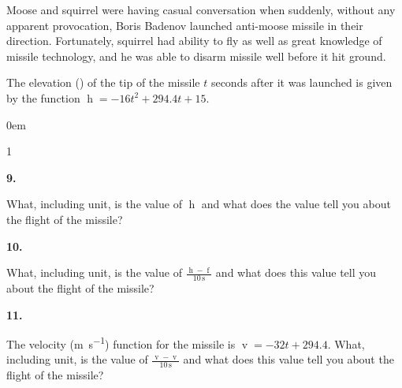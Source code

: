 \documentclass[12pt,]{book}
\theoremstyle{plain}
\theoremstyle{definition}
\numberwithin{equation}{section}
\newenvironment{exercisegroup}%
{\medskip\noindent}%
{\par\bigskip}%
\newlength{\exercisegroupindent}%
\newlength{\exercisegroupitemwidth}%
\newenvironment{exercisegrouplist}%
{\vspace{-\partopsep}%
\begin{adjustwidth}{\exercisegroupindent}{0em}}%
{\end{adjustwidth}%
\vspace{-\partopsep}%
\vspace{\baselineskip}}%
\newenvironment{exercisegroupbycol}[1]%
{\begin{exercisegrouplist}%
\vspace{-\multicolsep}%
\begin{multicols}{#1}%
\setlength{\parindent}{0em}%
\setlength{\exercisegroupitemwidth}{\linewidth}}%
{\end{multicols}%
\vspace{-\multicolsep}%
\end{exercisegrouplist}}%
\newenvironment{exercisegroupitem}[1]%
{\begin{minipage}[t]{\exercisegroupitemwidth}
\vspace{0pt}%
{\bfseries#1}%
\rule{0pt}{\baselineskip}}{\strut%
\end{minipage}%
\hspace{\columnsep}}%
\providecommand\phantomsection{}
\newcommand{\fe}[2]{\mathop{{#1}{\left(#2\right)}}}
\begin{document}
\begin{exercisegroup}%
Moose and squirrel were having casual conversation when suddenly, without any apparent provocation, Boris Badenov launched anti-moose missile in their direction. Fortunately, squirrel had ability to fly as well as great knowledge of missile technology, and he was able to disarm missile well before it hit ground.%
\par
The elevation (\si{\foot}) of the tip of the missile \(t\) seconds after it was launched is given by the function \(\fe{h}{t}=-16t^2+294.4t+15\).%
\begin{exercisegroupbycol}{1}%
\begin{exercisegroupitem}{9. }\phantomsection\hypertarget{exercise-17}{\null}
What, including unit, is the value of \(\fe{h}{12}\) and what does the value tell you about the flight of the missile?%
\end{exercisegroupitem}%
\par%
\begin{exercisegroupitem}{10. }\phantomsection\hypertarget{exercise-18}{\null}
What, including unit, is the value of \(\frac{\fe{h}{10\,\text{s}}-\fe{f}{0\,\text{s}}}{10\,\text{s}}\) and what does this value tell you about the flight of the missile?%
\end{exercisegroupitem}%
\par%
\begin{exercisegroupitem}{11. }\phantomsection\hypertarget{exercise-19}{\null}
The velocity (\si{\meter\per\second}) function for the missile is \(\fe{v}{t}=-32t+294.4\). What, including unit, is the value of \(\frac{\fe{v}{10\,\text{s}}-\fe{v}{0\,\text{s}}}{10\,\text{s}}\) and what does this value tell you about the flight of the missile?%
\end{exercisegroupitem}%
\par%
\end{exercisegroupbycol}%
\end{exercisegroup}%
\end{document}
